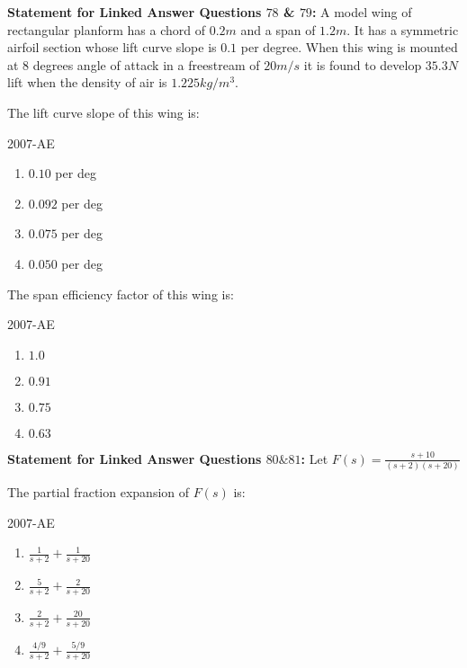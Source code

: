 \textbf{Statement for Linked Answer Questions $78$ \& $79$:}
A model wing of rectangular planform has a chord of $0.2 m$ and a span of $1.2 m$. It has a symmetric airfoil section whose lift curve slope is $0.1$ per degree. When this wing is mounted at $8$ degrees angle of attack in a freestream of $20 m/s$ it is found to develop $35.3 N$ lift when the density of air is $1.225 kg/m^3$.\\

\item The lift curve slope of this wing is:

\hfill{2007-AE}

\begin{enumerate}
    \item  $0.10$ per deg
    \item  $0.092$ per deg
    \item  $0.075$ per deg
    \item  $0.050$ per deg\\
\end{enumerate}

\item The span efficiency factor of this wing is:

\hfill{2007-AE}

\begin{enumerate}
    \item  $1.0$
    \item  $0.91$
    \item  $0.75$
    \item  $0.63$\\
\end{enumerate}

\textbf{Statement for Linked Answer Questions $80 \& 81$:}
Let $F(s) = \frac{s+10}{(s+2)(s+20)}$\\

\item The partial fraction expansion of $F(s)$ is:

\hfill{2007-AE}

\begin{enumerate}
    \item  $\frac{1}{s+2} + \frac{1}{s+20}$
    \item  $\frac{5}{s+2} + \frac{2}{s+20}$
    \item  $\frac{2}{s+2} + \frac{20}{s+20}$
    \item  $\frac{4/9}{s+2} + \frac{5/9}{s+20}$\\
\end{enumerate}

